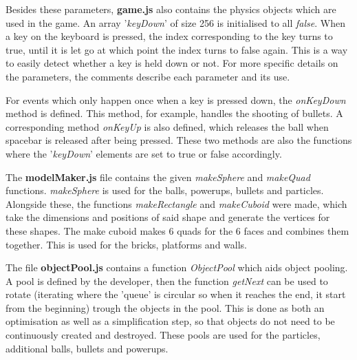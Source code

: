 Besides these parameters, \textbf{game.js} also contains the physics objects which are used in the game. An array '\textit{keyDown}' of size 256 is initialised to all \textit{false}. When a key on the keyboard is pressed, the index corresponding to the key turns to true, until it is let go at which point the index turns to false again. This is a way to easily detect whether a key is held down or not. For more specific details on the parameters, the comments describe each parameter and its use.

For events which only happen once when a key is pressed down, the \textit{onKeyDown} method is defined. This method, for example, handles the shooting of bullets. A corresponding method \textit{onKeyUp} is also defined, which releases the ball when spacebar is released after being pressed. These two methods are also the functions where the '\textit{keyDown}' elements are set to true or false accordingly.

The \textbf{modelMaker.js} file contains the given \textit{makeSphere} and \textit{makeQuad} functions. \textit{makeSphere} is used for the balls, powerups, bullets and particles. Alongside these, the functions \textit{makeRectangle} and \textit{makeCuboid} were made, which take the dimensions and positions of said shape and generate the vertices for these shapes. The make cuboid makes 6 quads for the 6 faces and combines them together. This is used for the bricks, platforms and walls.

The file \textbf{objectPool.js} contains a function \textit{ObjectPool} which aids object pooling. A pool is defined by the developer, then the function \textit{getNext} can be used to rotate (iterating where the 'queue' is circular so when it reaches the end, it start from the beginning) trough the objects in the pool. This is done as both an optimisation as well as a simplification step, so that objects do not need to be continuously created and destroyed. These pools are used for the particles, additional balls, bullets and powerups.


